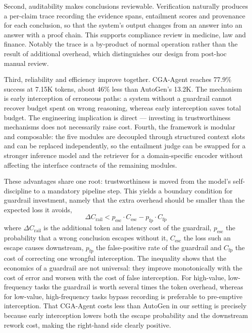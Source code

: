 \documentclass[journal,10pt,a4paper]{IEEEtran}
\begin{document}
Second, auditability makes conclusions reviewable. Verification naturally produces a per-claim trace recording the evidence spans, entailment scores and provenance for each conclusion, so that the system's output changes from an answer into an answer with a proof chain. This supports compliance review in medicine, law and finance. Notably the trace is a by-product of normal operation rather than the result of additional overhead, which distinguishes our design from post-hoc manual review.

Third, reliability and efficiency improve together. CGA-Agent reaches 77.9\% success at 7.15K tokens, about 46\% less than AutoGen's 13.2K. The mechanism is early interception of erroneous paths: a system without a guardrail cannot recover budget spent on wrong reasoning, whereas early interception saves total budget. The engineering implication is direct --- investing in trustworthiness mechanisms does not necessarily raise cost. Fourth, the framework is modular and composable: the five modules are decoupled through structured context slots and can be replaced independently, so the entailment judge can be swapped for a stronger inference model and the retriever for a domain-specific encoder without affecting the interface contracts of the remaining modules.

These advantages share one root: trustworthiness is moved from the model's self-discipline to a mandatory pipeline step. This yields a boundary condition for guardrail investment, namely that the extra overhead should be smaller than the expected loss it avoids,
\begin{equation}
\Delta C_{\mathrm{rail}}<p_{\mathrm{esc}}\cdot C_{\mathrm{esc}}-p_{\mathrm{fp}}\cdot C_{\mathrm{fp}}
\end{equation}
where $\Delta C_{\mathrm{rail}}$ is the additional token and latency cost of the guardrail, $p_{\mathrm{esc}}$ the probability that a wrong conclusion escapes without it, $C_{\mathrm{esc}}$ the loss such an escape causes downstream, $p_{\mathrm{fp}}$ the false-positive rate of the guardrail and $C_{\mathrm{fp}}$ the cost of correcting one wrongful interception. The inequality shows that the economics of a guardrail are not universal: they improve monotonically with the cost of error and worsen with the cost of false interception. For high-value, low-frequency tasks the guardrail is worth several times the token overhead, whereas for low-value, high-frequency tasks bypass recording is preferable to pre-emptive interception. That CGA-Agent costs less than AutoGen in our setting is precisely because early interception lowers both the escape probability and the downstream rework cost, making the right-hand side clearly positive.
\end{document}
